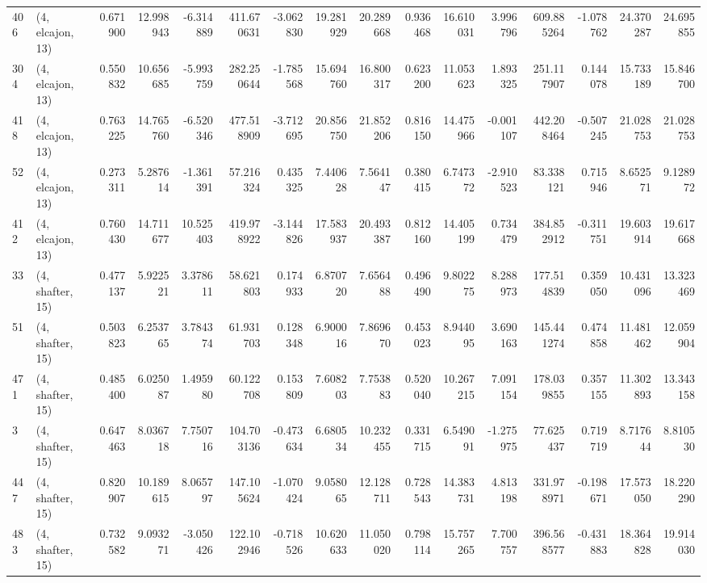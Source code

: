 \begin{tabular}{llrrrrrrrrrrrrrr}
406 &  (4, elcajon, 13) &   0.671900 &  12.998943 &  -6.314889 &   411.670631 &  -3.062830 &  19.281929 &  20.289668 &  0.936468 &  16.610031 &   3.996796 &   609.885264 & -1.078762 &  24.370287 &  24.695855 \\
304 &  (4, elcajon, 13) &   0.550832 &  10.656685 &  -5.993759 &   282.250644 &  -1.785568 &  15.694760 &  16.800317 &  0.623200 &  11.053623 &   1.893325 &   251.117907 &  0.144078 &  15.733189 &  15.846700 \\
418 &  (4, elcajon, 13) &   0.763225 &  14.765760 &  -6.520346 &   477.518909 &  -3.712695 &  20.856750 &  21.852206 &  0.816150 &  14.475966 &  -0.001107 &   442.208464 & -0.507245 &  21.028753 &  21.028753 \\
52  &  (4, elcajon, 13) &   0.273311 &   5.287614 &  -1.361391 &    57.216324 &   0.435325 &   7.440628 &   7.564147 &  0.380415 &   6.747372 &  -2.910523 &    83.338121 &  0.715946 &   8.652571 &   9.128972 \\
412 &  (4, elcajon, 13) &   0.760430 &  14.711677 &  10.525403 &   419.978922 &  -3.144826 &  17.583937 &  20.493387 &  0.812160 &  14.405199 &   0.734479 &   384.852912 & -0.311751 &  19.603914 &  19.617668 \\
33  &  (4, shafter, 15) &   0.477137 &   5.922521 &   3.378611 &    58.621803 &   0.174933 &   6.870720 &   7.656488 &  0.496490 &   9.802275 &   8.288973 &   177.514839 &  0.359050 &  10.431096 &  13.323469 \\
51  &  (4, shafter, 15) &   0.503823 &   6.253765 &   3.784374 &    61.931703 &   0.128348 &   6.900016 &   7.869670 &  0.453023 &   8.944095 &   3.690163 &   145.441274 &  0.474858 &  11.481462 &  12.059904 \\
471 &  (4, shafter, 15) &   0.485400 &   6.025087 &   1.495980 &    60.122708 &   0.153809 &   7.608203 &   7.753883 &  0.520040 &  10.267215 &   7.091154 &   178.039855 &  0.357155 &  11.302893 &  13.343158 \\
3   &  (4, shafter, 15) &   0.647463 &   8.036718 &   7.750716 &   104.703136 &  -0.473634 &   6.680534 &  10.232455 &  0.331715 &   6.549091 &  -1.275975 &    77.625437 &  0.719719 &   8.717644 &   8.810530 \\
447 &  (4, shafter, 15) &   0.820907 &  10.189615 &   8.065797 &   147.105624 &  -1.070424 &   9.058065 &  12.128711 &  0.728543 &  14.383731 &   4.813198 &   331.978971 & -0.198671 &  17.573050 &  18.220290 \\
483 &  (4, shafter, 15) &   0.732582 &   9.093271 &  -3.050426 &   122.102946 &  -0.718526 &  10.620633 &  11.050020 &  0.798114 &  15.757265 &   7.700757 &   396.568577 & -0.431883 &  18.364828 &  19.914030 \\

\end{tabular}
